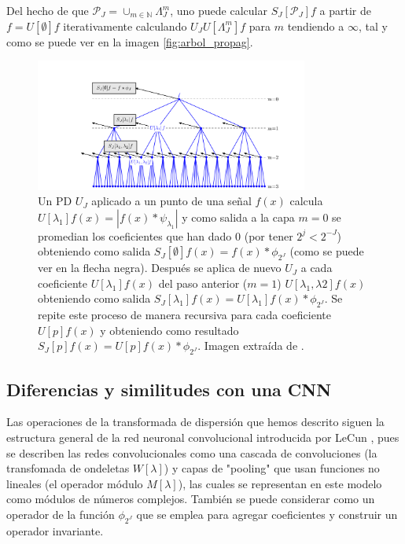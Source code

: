 \noindent Del hecho de que $\mathcal{P}_J=\cup_{m\in \mathbb{N}}\Lambda_J^m$, uno puede calcular $S_J[\mathcal{P}_J]f$ a partir de $f=U[\emptyset]f$ iterativamente calculando $U_J U[\Lambda_J^m]f$ para $m$ tendiendo a $\infty$, tal y como se puede ver en la imagen \autoref{fig:arbol_propag}. 

\begin{figure} [!h]
  \centering
  \includegraphics[width=0.8\textwidth]{img/ScatteringPropagator.png}
  \caption{Un PD $U_J$ aplicado a un punto de una señal $f(x)$ calcula $U[\lambda_1]f(x)=|f(x)\ast \psi_{\lambda_1}|$ y como salida a la capa $m=0$ se promedian los coeficientes que han dado $0$ (por tener $2^j<2^{-J}$) obteniendo como salida $S_J[\emptyset]f(x)=f(x)\ast \phi_{2^J}$ (como se puede ver en la flecha negra). Después se aplica de nuevo $U_J$ a cada coeficiente $U[\lambda_1]f(x)$ del paso anterior ($m=1$) $U[\lambda_1,\lambda2]f(x)$ obteniendo como salida $S_J[\lambda_1]f(x)=U[\lambda_1]f(x) \ast \phi_{2^J}$. Se repite este proceso de manera recursiva para cada coeficiente $U[p]f(x)$ y obteniendo como resultado $S_J[p]f(x)=U[p]f(x) \ast \phi_{2^J}$. Imagen extraída de \cite{bruna2013invariant}.}
  \label{fig:arbol_propag}
\end{figure}


\subsection{Diferencias y similitudes con una CNN}


Las operaciones de la transformada de dispersión que hemos descrito siguen la estructura general de la red neuronal convolucional introducida por LeCun \cite{lecun2015deep}, pues se describen las redes convolucionales como una cascada de convoluciones (la transfomada de ondeletas $W[\lambda]$) y capas de "pooling" que usan funciones no lineales (el operador módulo $M[\lambda]$), las cuales se representan en este modelo como módulos de números complejos. También se puede considerar como un operador de  la función $\phi_{2^J}$ que se emplea para agregar coeficientes y construir un operador invariante.

